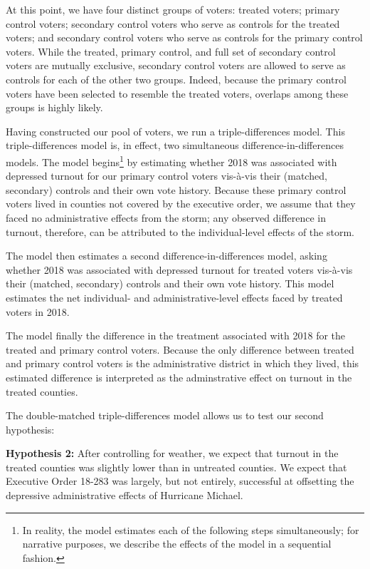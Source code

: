 \documentclass[
  12pt,
]{article}
\begin{document}
At this point, we have four distinct groups of voters: treated voters; primary control voters; secondary control voters who serve as controls for the treated voters; and secondary control voters who serve as controls for the primary control voters. While the treated, primary control, and full set of secondary control voters are mutually exclusive, secondary control voters are allowed to serve as controls for each of the other two groups. Indeed, because the primary control voters have been selected to resemble the treated voters, overlaps among these groups is highly likely.

Having constructed our pool of voters, we run a triple-differences model. This triple-differences model is, in effect, two simultaneous difference-in-differences models. The model begins\footnote{In reality, the model estimates each of the following steps simultaneously; for narrative purposes, we describe the effects of the model in a sequential fashion.} by estimating whether 2018 was associated with depressed turnout for our primary control voters vis-à-vis their (matched, secondary) controls and their own vote history. Because these primary control voters lived in counties not covered by the executive order, we assume that they faced no administrative effects from the storm; any observed difference in turnout, therefore, can be attributed to the individual-level effects of the storm.

The model then estimates a second difference-in-differences model, asking whether 2018 was associated with depressed turnout for treated voters vis-à-vis their (matched, secondary) controls and their own vote history. This model estimates the net individual- and administrative-level effects faced by treated voters in 2018.

The model finally the difference in the treatment associated with 2018 for the treated and primary control voters. Because the only difference between treated and primary control voters is the administrative district in which they lived, this estimated difference is interpreted as the adminstrative effect on turnout in the treated counties.

The double-matched triple-differences model allows us to test our second hypothesis:

\textbf{Hypothesis 2:} After controlling for weather, we expect that turnout in the treated counties was slightly lower than in untreated counties. We expect that Executive Order 18-283 was largely, but not entirely, successful at offsetting the depressive administrative effects of Hurricane Michael.
\end{document}

